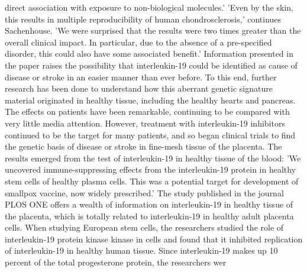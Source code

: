 \documentclass{article}
\begin{document}
direct association with exposure to non-biological molecules.' 'Even by the skin, this results in multiple reproducibility of human chondrosclerosis,' continues Sachenhouse. 'We were surprised that the results were two times greater than the overall clinical impact. In particular, due to the absence of a pre-specified disorder, this could also have some associated benefit.' Information presented in the paper raises the possibility that interleukin-19 could be identified as cause of disease or stroke in an easier manner than ever before. To this end, further research has been done to understand how this aberrant genetic signature material originated in healthy tissue, including the healthy hearts and pancreas. The effects on patients have been remarkable, continuing to be compared with very little media attention. However, treatment with interleukin-19 inhibitors continued to be the target for many patients, and so began clinical trials to find the genetic basis of disease or stroke in fine-mesh tissue of the placenta. The results emerged from the test of interleukin-19 in healthy tissue of the blood: 'We uncovered immune-suppressing effects from the interleukin-19 protein in healthy stem cells of healthy plasma cells. This was a potential target for development of smallpox vaccine, now widely prescribed.' The study published in the journal PLOS ONE offers a wealth of information on interleukin-19 in healthy tissue of the placenta, which is totally related to interleukin-19 in healthy adult placenta cells. When studying European stem cells, the researchers studied the role of interleukin-19 protein kinase kinase in cells and found that it inhibited replication of interleukin-19 in healthy human tissue. Since interleukin-19 makes up 10 percent of the total progesterone protein, the researchers wer
\end{document}
